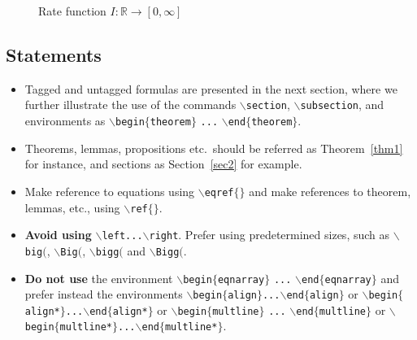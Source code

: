 \documentclass[reqno,final,11pt]{amsart}
\theoremstyle{plain}
\theoremstyle{definition}
\theoremstyle{remark}
\begin{document}
\begin{figure}[!htb]
\centering
{}
\caption{Rate function $I:\mathbb R\to [0,\infty]$}
\label{fig1}
\end{figure}



\subsection{Statements}
\label{ss_statements}

\begin{itemize}
\item Tagged and untagged formulas are presented in the next section, where
we further illustrate the use of the commands {\tt $\backslash$section},
{\tt $\backslash$subsection}, and  environments as
{\tt $\backslash$begin$\{$theorem$\}$} {\tt ...}
{\tt $\backslash$end$\{$theorem$\}$}.

\item Theorems, lemmas, propositions etc.\ should be referred as
Theorem~\ref{thm1} for instance, and sections as Section~\ref{sec2}
for example.

\item Make reference to equations using \texttt{$\backslash$eqref$\{\}$} and
make references to theorem, lemmas, etc., using \texttt{$\backslash$ref$\{\}$}.
    
\item \textbf{Avoid using} \texttt{$\backslash$left...$\backslash$right}.
Prefer using predetermined sizes, such as \texttt{$\backslash$big$($},
\texttt{$\backslash$Big$($}, \texttt{$\backslash$bigg$($} and
\texttt{$\backslash$Bigg$($}.

\item \textbf{Do not use} the environment \texttt{$\backslash$begin$\{$eqnarray$\}$}
\texttt{...} \texttt{$\backslash$end$\{$eqnarray$\}$} and prefer instead the
environments \texttt{$\backslash$begin$\{$align$\}$}\texttt{...$\backslash$end$\{$align$\}$}
or \texttt{$\backslash$begin$\{$align*$\}$...$\backslash$end$\{$align*$\}$}
or \texttt{$\backslash$begin$\{$multline$\}$} \texttt{...} \texttt{$\backslash$end$\{$multline$\}$}
or \texttt{$\backslash$begin$\{$multline*$\}$...$\backslash$end$\{$multline*$\}$}.
\end{itemize}
  
\end{document}
